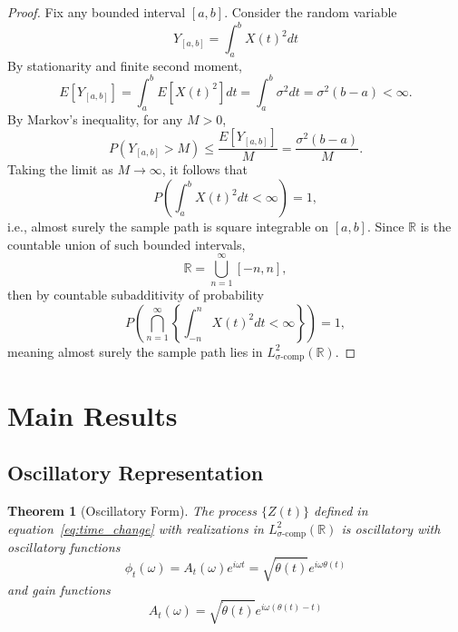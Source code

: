 \documentclass{article}
\newtheorem{theorem}{Theorem}[section]
\begin{document}
\begin{proof}
Fix any bounded interval $[a,b]$. Consider the random variable
\begin{equation}
Y_{[a,b]} = \int_a^b X(t)^2 dt
\end{equation}
By stationarity and finite second moment,
\begin{equation}
E[Y_{[a,b]}] = \int_a^b E[X(t)^2] dt = \int_a^b \sigma^2 dt = \sigma^2 (b - a) < \infty.
\end{equation}
By Markov's inequality, for any $M > 0$,
\begin{equation}
P(Y_{[a,b]} > M) \leq \frac{E[Y_{[a,b]}]}{M} = \frac{\sigma^2 (b - a)}{M}.
\end{equation}
Taking the limit as $M \to \infty$, it follows that
\begin{equation}
P\left(\int_a^b X(t)^2 dt < \infty\right) = 1,
\end{equation}
i.e., almost surely the sample path is square integrable on $[a,b]$. Since $\mathbb{R}$ is the countable union of such bounded intervals,
\begin{equation}
\mathbb{R} = \bigcup_{n=1}^\infty [-n, n],
\end{equation}
then by countable subadditivity of probability
\begin{equation}
P\left(\bigcap_{n=1}^\infty \left\{\int_{-n}^n X(t)^2 dt < \infty\right\}\right) = 1,
\end{equation}
meaning almost surely the sample path lies in $L^2_{\sigma\text{-comp}}(\mathbb{R})$.
\end{proof}

\section{Main Results}

\subsection{Oscillatory Representation}

\begin{theorem}[Oscillatory Form]\label{thm:osc_rep}
The process $\{Z(t)\}$ defined in equation~\eqref{eq:time_change} with realizations in $L^2_{\sigma\text{-comp}}(\mathbb{R})$ is oscillatory with oscillatory functions
\begin{equation}
\label{eq:phi_def}
\phi_t(\omega) = A_t(\omega) e^{i\omega t} = \sqrt{\dot{\theta}(t)} e^{i\omega \theta(t)}
\end{equation}
and gain functions
\begin{equation}
A_t(\omega) = \sqrt{\dot{\theta}(t)} e^{i\omega(\theta(t) - t)}
\end{equation}
\end{theorem}
\end{document}
